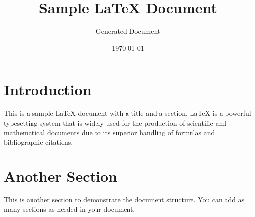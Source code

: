 \documentclass{article}
\title{Sample LaTeX Document}
\author{Generated Document}
\date{\today}
\begin{document}
\maketitle

\section{Introduction}
This is a sample LaTeX document with a title and a section. LaTeX is a powerful typesetting system that is widely used for the production of scientific and mathematical documents due to its superior handling of formulas and bibliographic citations.

\section{Another Section}
This is another section to demonstrate the document structure. You can add as many sections as needed in your document.
\end{document}
